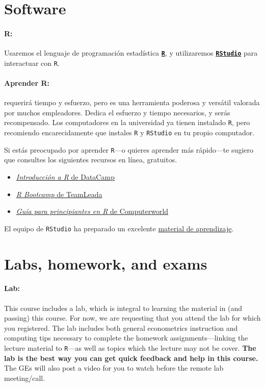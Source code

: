 \documentclass[10pt]{article}
\begin{document}
\section*{Software}

\paragraph{R:} Usaremos el lenguaje de programación estadística \href{https://www.r-project.org/}{\textbf{\texttt{R}}}, y utilizaremos \href{https://www.rstudio.com}{\textbf{\texttt{RStudio}}} para interactuar con \texttt{R}.

\paragraph{Aprender R:} requerirá tiempo y esfuerzo, pero es una herramienta poderosa y versátil valorada por muchos empleadores. Dedica el esfuerzo y tiempo necesarios, y serás recompensado. Los computadores en la universidad ya tienen instalado \texttt{R}, pero recomiendo encarecidamente que instales \texttt{R} y \texttt{RStudio} en tu propio computador.

Si estás preocupado por aprender \texttt{R}---o quieres aprender más rápido---te sugiero que consultes los siguientes recursos en línea, gratuitos.
\begin{itemize}
	\item \href{https://www.datacamp.com/courses/free-introduction-to-r}{\textit{Introducción a R} de DataCamp}
	\item \href{https://www.teamleada.com/courses/r-bootcamp}{\textit{R Bootcamp} de TeamLeada}
	\item \href{https://www.computerworld.com/article/2497143/business-intelligence-beginner-s-guide-to-r-introduction.html}{\textit{Guía para principiantes en R} de Computerworld}
\end{itemize}
El equipo de \texttt{RStudio} ha preparado un excelente \href{https://education.rstudio.com/learn/beginner/}{material de aprendizaje}.


\section*{Labs, homework, and exams}

\paragraph{Lab:} This course includes a lab, which is integral to learning the material in (and passing) this course. For now, we are requesting that you attend the lab for which you registered. The lab includes both general econometrics instruction and computing tips necessary to complete the homework assignments---linking the lecture material to \texttt{R}---as well as topics which the lecture may not be cover. \textbf{The lab is the best way you can get quick feedback and help in this course.} The GEs will also post a video for you to watch before the remote lab meeting/call.
\end{document}
